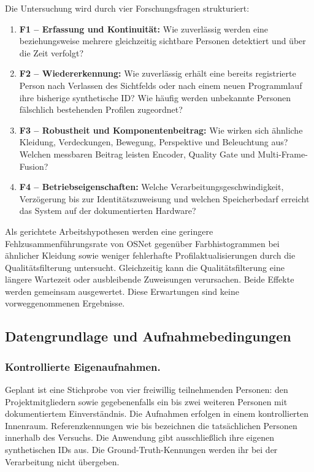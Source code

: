 \documentclass[runningheads]{llncs}
\begin{document}
Die Untersuchung wird durch vier Forschungsfragen strukturiert:
\begin{enumerate}
\item \textbf{F1 -- Erfassung und Kontinuität:} Wie zuverlässig werden eine beziehungsweise mehrere gleichzeitig sichtbare Personen detektiert und über die Zeit verfolgt?
\item \textbf{F2 -- Wiedererkennung:} Wie zuverlässig erhält eine bereits registrierte Person nach Verlassen des Sichtfelds oder nach einem neuen Programmlauf ihre bisherige synthetische ID? Wie häufig werden unbekannte Personen fälschlich bestehenden Profilen zugeordnet?
\item \textbf{F3 -- Robustheit und Komponentenbeitrag:} Wie wirken sich ähnliche Kleidung, Verdeckungen, Bewegung, Perspektive und Beleuchtung aus? Welchen messbaren Beitrag leisten Encoder, Quality Gate und Multi-Frame-Fusion?
\item \textbf{F4 -- Betriebseigenschaften:} Welche Verarbeitungsgeschwindigkeit, Verzögerung bis zur Identitätszuweisung und welchen Speicherbedarf erreicht das System auf der dokumentierten Hardware?
\end{enumerate}

Als gerichtete Arbeitshypothesen werden eine geringere Fehlzusammenführungsrate von OSNet gegenüber Farbhistogrammen bei ähnlicher Kleidung sowie weniger fehlerhafte Profilaktualisierungen durch die Qualitätsfilterung untersucht. Gleichzeitig kann die Qualitätsfilterung eine längere Wartezeit oder ausbleibende Zuweisungen verursachen. Beide Effekte werden gemeinsam ausgewertet. Diese Erwartungen sind keine vorweggenommenen Ergebnisse.

\subsection{Datengrundlage und Aufnahmebedingungen}

\subsubsection{Kontrollierte Eigenaufnahmen.}
Geplant ist eine Stichprobe von vier freiwillig teilnehmenden Personen: den Projektmitgliedern sowie gegebenenfalls ein bis zwei weiteren Personen mit dokumentiertem Einverständnis. Die Aufnahmen erfolgen in einem kontrollierten Innenraum. Referenzkennungen wie  bis  bezeichnen die tatsächlichen Personen innerhalb des Versuchs. Die Anwendung gibt ausschließlich ihre eigenen synthetischen IDs aus. Die Ground-Truth-Kennungen werden ihr bei der Verarbeitung nicht übergeben.
\end{document}
